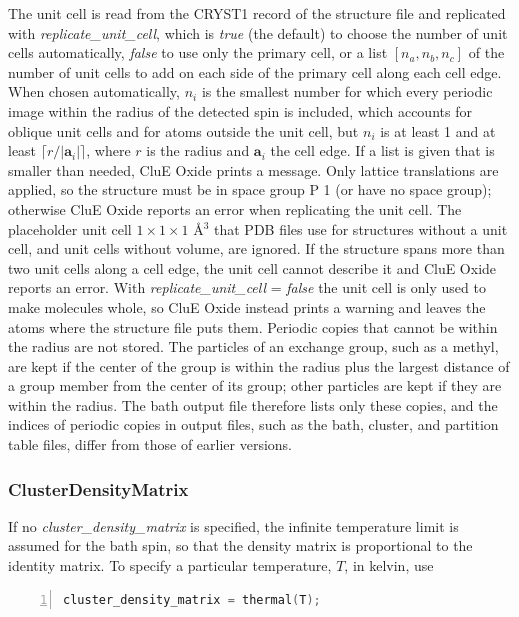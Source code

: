 \documentclass{book}
\begin{document}
The unit cell is read from the CRYST1 record of the structure file
and replicated with \textit{replicate\_unit\_cell}, which is
\textit{true} (the default) to choose the number of unit cells automatically,
\textit{false} to use only the primary cell, 
or a list $[n_a, n_b, n_c]$ of the number of unit cells to add on each side 
of the primary cell along each cell edge.
When chosen automatically, $n_i$ is the smallest number for which every 
periodic image within the radius of the detected spin is included,
which accounts for oblique unit cells and for atoms outside the unit cell,
but $n_i$ is at least 1 and at least $\lceil r/|\mathbf{a}_i| \rceil$, 
where $r$ is the radius and $\mathbf{a}_i$ the cell edge.
If a list is given that is smaller than needed, CluE Oxide prints a message.
Only lattice translations are applied, so the structure must be 
in space group P 1 (or have no space group);
otherwise CluE Oxide reports an error when replicating the unit cell.
The placeholder unit cell $1\times1\times1$ \AA$^3$ that PDB files use 
for structures without a unit cell, and unit cells without volume,
are ignored.
If the structure spans more than two unit cells along a cell edge,
the unit cell cannot describe it and CluE Oxide reports an error.
With \textit{replicate\_unit\_cell} = \textit{false} the unit cell is 
only used to make molecules whole, so CluE Oxide instead prints a warning 
and leaves the atoms where the structure file puts them.
Periodic copies that cannot be within the radius are not stored.
The particles of an exchange group, such as a methyl, are kept 
if the center of the group is within the radius plus the largest
distance of a group member from the center of its group;
other particles are kept if they are within the radius.
The bath output file therefore lists only these copies,
and the indices of periodic copies in output files, such as the bath,
cluster, and partition table files, differ from those of earlier versions.
\subsubsection{ClusterDensityMatrix} %
If no \textit{cluster\_density\_matrix} is specified, the infinite temperature
limit is assumed for the bath spin, so that the density matrix is proportional
to the identity matrix.  To specify a particular temperature, $T$, in kelvin, 
use
\begin{lstlisting}[frame=single,numbers=left,language=c]
cluster_density_matrix = thermal(T);
\end{lstlisting}
\end{document}

